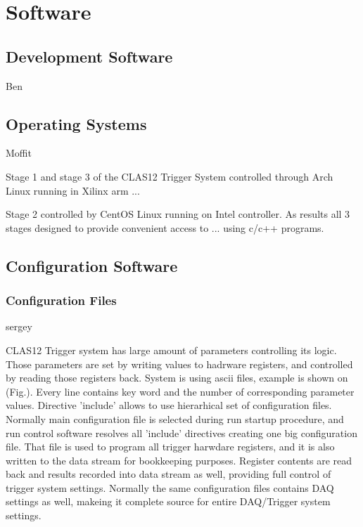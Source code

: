 \section{Software}



\subsection{Development Software} Ben

\subsection{Operating Systems} Moffit

Stage 1 and stage 3 of the CLAS12 Trigger System controlled through Arch Linux running in Xilinx arm ...

Stage 2 controlled by CentOS Linux running on Intel controller. As results all 3 stages designed to provide convenient access to ...
using c/c++ programs.




\subsection{Configuration Software}

\subsubsection{Configuration Files} sergey

CLAS12 Trigger system has large amount of parameters controlling its logic. Those parameters are set by writing values to hadrware registers, and controlled by reading those registers back. System is using ascii files, example is shown on (Fig.). Every line contains key word and the number of corresponding parameter values. Directive 'include' allows to use hierarhical set of configuration files. Normally main configuration file is selected during run startup procedure, and run control software resolves all 'include' directives creating one big configuration file. That file is used to program all trigger harwdare registers, and it is also written to the data stream for bookkeeping purposes. Register contents are read back and results recorded into data stream as well, providing full control of trigger system settings. Normally the same configuration files contains DAQ settings as well, makeing it complete source for entire DAQ/Trigger system settings.


